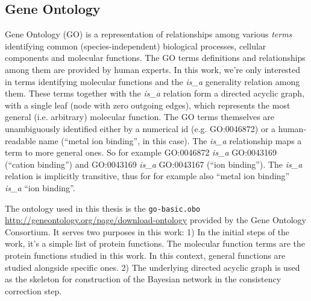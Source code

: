 \documentclass[11pt,twoside,a4paper]{book}
\begin{document}
\subsection{Gene Ontology}
Gene Ontology (GO) \cite{go} is a representation of relationships among various \emph{terms} identifying common (species-independent)
biological processes, cellular components and molecular functions.
The GO terms definitions and relationships among them are provided by human experts. 
In this work, we're only interested in terms identifying molecular functions and the \emph{is\_a} generality relation among them.
These terms together with the \emph{is\_a} relation form a directed acyclic graph, with a single leaf (node with zero outgoing edges),
which represents the
most general (i.e. arbitrary) molecular function. 
The GO terms themselves are unambiguously identified either by a numerical id (e.g. GO:0046872) or a human-readable name
(``metal ion binding'', in this case).
The \emph{is\_a} relationship maps a term to more general ones. So for example GO:0046872 \emph{is\_a} GO:0043169 (``cation binding'')
 and GO:0043169  \emph{is\_a} GO:0043167 (``ion binding'').
 The \emph{is\_a} relation is implicitly transitive,
 thus for for example also ``metal ion binding''  \emph{is\_a} ``ion binding''.
 
The ontology used in this thesis is the \texttt{go-basic.obo} \cite{gores} \url{http://geneontology.org/page/download-ontology} provided by the Gene Ontology Consortium. 
It serves two purposes in this work:
1) In the initial steps of the work, it's a simple list of protein functions.
The molecular function terms are the protein functions studied in this work.
In this context, general functions are studied alongside specific ones. 
2) The underlying directed acyclic graph is used as the skeleton for construction of the 
Bayesian network in the consistency correction step. 
\end{document}
